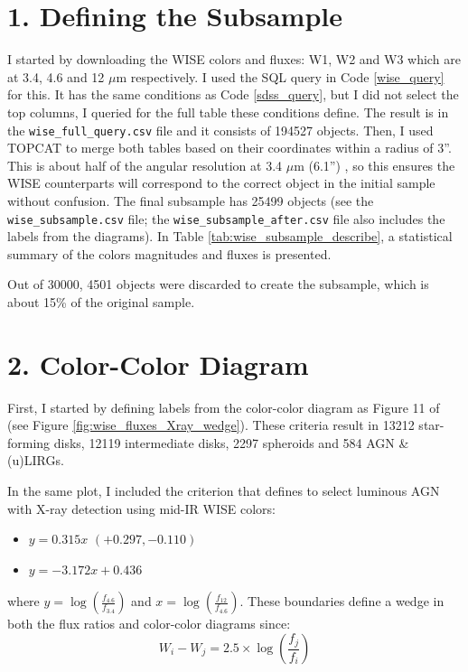 \documentclass[letterpaper, oneside]{article}
\begin{document}
	\section*{1. Defining the Subsample}
	
	I started by downloading the WISE colors and fluxes: W1, W2 and W3 which are at 3.4, 4.6 and 12 $\mu$m respectively. I used the SQL query in Code \ref{wise_query} for this. It has the same conditions as Code \ref{sdss_query}, but I did not select the top columns, I queried for the full table these conditions define. The result is in the \texttt{wise\_full\_query.csv} file and it consists of 194527 objects. Then, I used TOPCAT \cite{topcat} to merge both tables based on their coordinates within a radius of 3''. This is about half of the angular resolution at 3.4 $\mu$m (6.1'') \cite{Wright_2010}, so this ensures the WISE counterparts will correspond to the correct object in the initial sample without confusion. The final subsample has 25499 objects (see the \texttt{wise\_subsample.csv} file; the \texttt{wise\_subsample\_after.csv} file also includes the labels from the diagrams). In Table \ref{tab:wise_subsample_describe}, a statistical summary of the colors magnitudes and fluxes is presented.
	
	Out of 30000, 4501 objects were discarded to create the subsample, which is about 15\% of the original sample.
	
	\section*{2. Color-Color Diagram}
	
	First, I started by defining labels from the color-color diagram as Figure 11 of \cite{Jarrett_2017} (see Figure \ref{fig:wise_fluxes_Xray_wedge}).  These criteria result in 13212 star-forming disks, 12119 intermediate disks, 2297 spheroids and 584 AGN \& (u)LIRGs.
	
	In the same plot, I included the criterion that \cite{Mateos_2012} defines to select luminous AGN with X-ray detection using mid-IR WISE colors:
	\begin{itemize}
		\item $y = 0.315 x$ $ (+ 0.297, - 0.110)$
		
		\item $y = - 3.172 x + 0.436$
	\end{itemize}
	
	\noindent where $y = \log{\left( \frac{f_{4.6}}{f_{3.4}} \right)  }$ and $x = \log{\left( \frac{f_{12}}{f_{4.6}} \right)  }$. These boundaries define a wedge in both the flux ratios and color-color diagrams since:
	$$
	W_i - W_j = 2.5 \times \log{\left( \frac{f_j}{f_i} \right)  }
	$$
	
\end{document}
